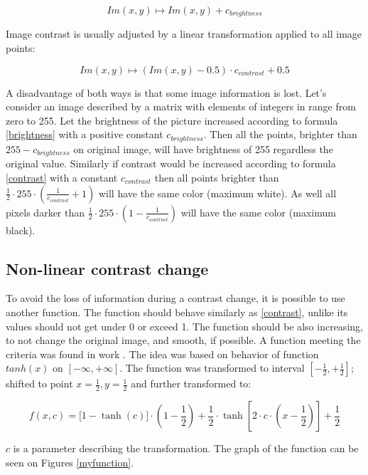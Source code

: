\begin{equation}
\label{brightness}
  Im(x,y) \longmapsto Im(x,y) + c_{brightness} 
\end{equation}

Image contrast is usually adjusted by a linear transformation applied to all image points:

\begin{equation}
\label{contrast}
  Im(x,y) \longmapsto   (Im(x,y) - 0.5) \cdot c_{contrast} + 0.5
\end{equation}

A disadvantage of both ways is that some image information is lost. Let's consider an image described by a matrix with elements of integers in range from zero to 255. Let the brightness of the picture increased according to formula \eqref{brightness} with a positive constant $ c_{brightness} $. Then all the points, brighter than $ 255 - c_{brightness} $ on original image, will have brightness of 255 regardless the original value. Similarly if contrast would be increased according to formula \eqref{contrast} with a constant $ c_{contrast} $ then all points brighter than $ \frac{1}{2} \cdot 255 \cdot (\frac{1}{c_{contrast}}+1) $ will have the same color (maximum white). As well all pixels darker than $ \frac{1}{2} \cdot 255 \cdot (1 - \frac{1}{c_{contrast}}) $ will have the same color (maximum black).

\subsection{Non-linear contrast change}
To avoid the loss of information during a contrast change, it is possible to use another function. The function should behave similarly as \ref{contrast}, unlike its values should not get under 0 or exceed 1. The function should be also increasing, to not change the original image, and smooth, if possible. A function meeting the criteria was found in work \cite[page~18]{flaska_vu}. The idea was based on behavior of function $tanh(x)$ on $[-\infty,+\infty]$. The function was transformed to interval $[-\frac{1}{2},+\frac{1}{2}]$; shifted to point $x=\frac{1}{2}, y=\frac{1}{2}$ and further transformed to:

 \[ f(x,c)= \bigg[ 1-\tanh(c) \bigg] \cdot \left(1-\frac{1}{2}\right) + \frac{1}{2} \cdot \tanh\left[ 2 \cdot c \cdot \left(x - \frac{1}{2}\right) \right] + \frac{1}{2} \]
 
 $c$ is a parameter describing the transformation. The graph of the function can be seen on Figures \ref{myfunction}.


